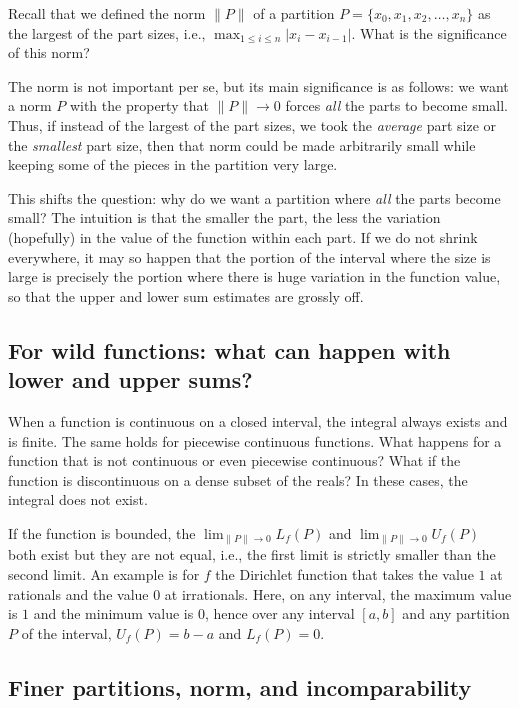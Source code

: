 \documentclass{amsart}
\begin{document}
Recall that we defined the norm $\|P\|$ of a partition $P = \{ x_0,
x_1, x_2, \dots, x_n \}$ as the largest of the part sizes, i.e.,
$\max_{1 \le i \le n} |x_i - x_{i-1}|$. What is the significance of
this norm?

The norm is not important per se, but its main significance is as
follows: we want a norm $P$ with the property that $\| P \| \to 0$
forces {\em all} the parts to become small. Thus, if instead of the
largest of the part sizes, we took the {\em average} part size or the
{\em smallest} part size, then that norm could be made arbitrarily
small while keeping some of the pieces in the partition very
large.

This shifts the question: why do we want a partition where {\em all}
the parts become small? The intuition is that the smaller the part,
the less the variation (hopefully) in the value of the function within
each part. If we do not shrink everywhere, it may so happen that the
portion of the interval where the size is large is precisely the
portion where there is huge variation in the function value, so that
the upper and lower sum estimates are grossly off.

\subsection{For wild functions: what can happen with lower and upper sums?}

When a function is continuous on a closed interval, the integral
always exists and is finite. The same holds for piecewise continuous
functions. What happens for a function that is not continuous or even
piecewise continuous? What if the function is discontinuous on a dense
subset of the reals? In these cases, the integral does not exist.

If the function is bounded, the $\lim_{\| P \| \to 0} L_f(P)$ and
$\lim_{\| P \| \to 0} U_f(P)$ both exist but they are not equal, i.e.,
the first limit is strictly smaller than the second limit. An example
is for $f$ the Dirichlet function that takes the value $1$ at
rationals and the value $0$ at irrationals. Here, on any interval, the
maximum value is $1$ and the minimum value is $0$, hence over any
interval $[a,b]$ and any partition $P$ of the interval, $U_f(P) = b -
a$ and $L_f(P) = 0$.

\subsection{Finer partitions, norm, and incomparability}
\end{document}
